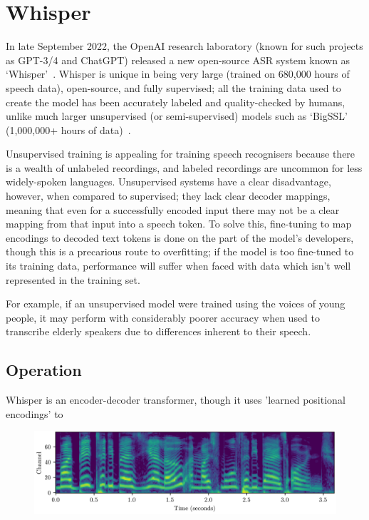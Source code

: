 \section{Whisper}

In late September 2022, the OpenAI research laboratory (known for such projects as GPT-3/4 and ChatGPT) released a new open-source ASR system known as `Whisper'~\cite{whisper}.
Whisper is unique in being very large (trained on 680,000 hours of speech data), open-source, and fully supervised;
all the training data used to create the model has been accurately labeled and quality-checked by humans, unlike much larger unsupervised (or semi-supervised) models such as `BigSSL' (1,000,000+ hours of data)~\cite{bigssl}.

Unsupervised training is appealing for training speech recognisers because there is a wealth of unlabeled recordings, and labeled recordings are uncommon for less widely-spoken languages\cite{baevski2021}.
Unsupervised systems have a clear disadvantage, however, when compared to supervised; they lack clear decoder mappings\cite{whisper}, meaning that even for a successfully encoded input there may not be a clear mapping from that input into a speech token.
To solve this, fine-tuning to map encodings to decoded text tokens is done on the part of the model's developers, though this is a precarious route to overfitting;
if the model is too fine-tuned to its training data, performance will suffer when faced with data which isn't well represented in the training set.

For example, if an unsupervised model were trained using the voices of young people, it may perform with considerably poorer accuracy when used to transcribe elderly speakers due to differences inherent to their speech\cite{Horton2010}.

\subsection{Operation}

Whisper is an encoder-decoder transformer, though it uses 'learned positional encodings' to 

\begin{figure}[h!]
  \includegraphics[width=\textwidth]{figures/specgram.png}
\centering 
\end{figure}

